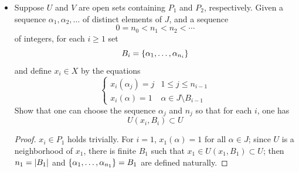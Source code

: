 \documentclass[12pt,a4paper]{article}
\begin{document}
\begin{ex}
\begin{itemize}
\begin{proof}
                Let $x\in P_1^\complement$. Then $x(\alpha)=x(\beta)\neq1$ for some $\alpha\neq\beta$. It is trivial that $U(x,\set{\alpha,\beta})$ is a neighborhood of $x$ contained in $P_1^\complement$. Hence $P_1$ is closed. $P_2$ is closed by similar argument.
            \end{proof}
            \item Suppose $U$ and $V$ are open sets containing $P_1$ and $P_2$, respectively. Given a sequence $\alpha_1,\alpha_2,\dots$ of distinct elements of $J$, and a sequence
            $$
            0=n_0<n_1<n_2<\cdots
            $$
            of integers, for each $i\geq 1$ set
            $$
            B_i=\left\{\alpha_1,\dots,\alpha_{n_i}\right\}
            $$
            and define $x_i\in X$ by the equations
            $$
            \begin{cases}
                x_i(\alpha_j)=j & 1\leq j\leq n_{i-1}\\
                x_i(\alpha)=1 & \alpha\in J\setminus B_{i-1}
            \end{cases}
            $$
            Show that one can choose the sequence $\alpha_j$ and $n_j$ so that for each $i$, one has
            $$
            U(x_i,B_i)\subset U            
            $$
            \begin{proof}
                $x_i\in P_1$ holds trivially. For $i=1$, $x_1(\alpha)=1$ for all $\alpha\in J$; since $U$ is a neighborhood of $x_1$, there is finite $B_1$ such that $x_1\in U(x_1,B_1)\subset U$; then $n_1=\left\lvert B_1\right\rvert$ and $\left\{\alpha_1,\dots,\alpha_{n_1}\right\}=B_1$ are defined naturally.


\end{proof}
\end{itemize}
\end{ex}
\end{document}
